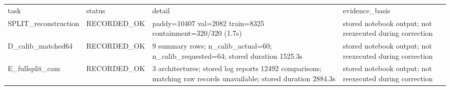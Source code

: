 \begin{tabular}{llll}
task & status & detail & evidence\_basis \\
SPLIT\_reconstruction & RECORDED\_OK & paddy=10407 val=2082 train=8325 containment=320/320 (1.7s) & stored notebook output; not reexecuted during correction \\
D\_calib\_matched64 & RECORDED\_OK & 9 summary rows; n\_calib\_actual=60; n\_calib\_requested=64; stored duration 1525.3s & stored notebook output; not reexecuted during correction \\
E\_fullsplit\_cam & RECORDED\_OK & 3 architectures; stored log reports 12492 comparisons; matching raw records unavailable; stored duration 2884.3s & stored notebook output; not reexecuted during correction \\
\end{tabular}
